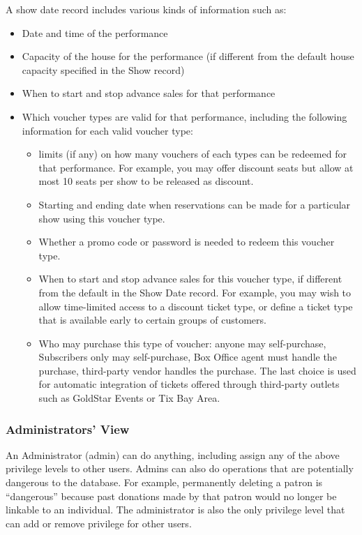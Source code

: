 A show date record includes various kinds of information such as:
\begin{itemize}
\item Date and time of the performance
\item Capacity of the house for the performance (if different from the
  default house capacity specified in the Show record)
\item When to start and stop advance sales for that performance
\item Which voucher types are valid for that performance, including the
  following information for each valid voucher type:
  \begin{itemize} 
    \item limits (if
      any) on how many vouchers of each types can be redeemed for that
      performance. For example, you may offer discount seats but allow at
      most 10 seats per show to be released as discount.
    \item Starting and ending date when reservations can be made for a
      particular show using this voucher type.
    \item Whether a promo code or password is needed to redeem this
      voucher type. 
    \item When to start and stop advance sales for this voucher type, if
      different from the default in the Show Date record.  For example,
      you may wish to allow time-limited access to a discount ticket
      type, or define a ticket type that is available early to certain
      groups of customers.
    \item Who may purchase this type of voucher: anyone may
      self-purchase, Subscribers 
      only may self-purchase, Box Office agent must handle the purchase,
      third-party vendor handles the purchase. The last choice is used
      for automatic integration of tickets offered through third-party
      outlets such as GoldStar Events or Tix Bay Area.
  \end{itemize}
\end{itemize}

\subsubsection{Administrators' View}

An Administrator (admin) can do anything, including assign any of the
above privilege levels to other users.  Admins can also do
operations that are
potentially dangerous to the database.  For example, permanently
deleting a patron is ``dangerous'' because past donations made by that
patron would no longer be linkable to an individual.  The administrator
is also the only privilege level that can add or remove privilege for
other users.

